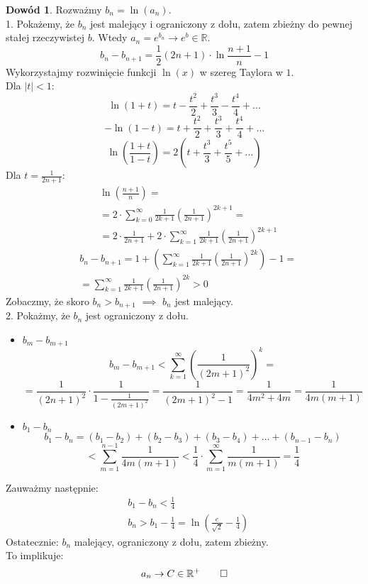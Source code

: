 \documentclass{article}
\theoremstyle{definition}
\theoremstyle{definition}
\newtheorem{dd}{Dowód}[subsection]
\theoremstyle{definition}
\theoremstyle{definition}
\theoremstyle{definition}
\theoremstyle{definition}
\begin{document}
\begin{dd}
    Rozważmy $b_n = \ln(a_n)$.\\
    1. Pokażemy, że $b_n$ jest malejący i ograniczony z dołu, zatem zbieżny do pewnej stałej rzeczywistej $b$. 
    Wtedy $a_n=e^{b_n} \rightarrow e^{b} \in \mathbb{R}$.
    \[b_n - b_{n+1} = \frac{1}{2}(2n+1) \cdot \ln {\frac{n+1}{n}} - 1\]
    Wykorzystajmy rozwinięcie funkcji $\ln(x)$ w szereg Taylora w $1$.\\
    Dla $|t| < 1$:
    \[\ln(1+t) = t - \frac{t^2}{2} + \frac{t^3}{3} - \frac{t^4}{4} + \dots\]
    \[-\ln(1-t) = t + \frac{t^2}{2} + \frac{t^3}{3} + \frac{t^4}{4} + \dots\]
    \[\ln\left(\frac{1+t}{1-t}\right) = 2 \left(t + \frac{t^3}{3} + \frac{t^5}{5} + \dots \right)\]
    Dla $t=\frac{1}{2n+1}$:
    \begin{align}
        &\ln\left(\frac{n+1}{n}\right)=\\
        &= 2\cdot \sum_{k=0}^{\infty} \frac{1}{2k+1} \left(\frac{1}{2n+1}\right)^{2k+1}=\\
        &= 2\cdot \frac{1}{2n+1} + 2\cdot \sum_{k=1}^{\infty} \frac{1}{2k+1} \left(\frac{1}{2n+1}\right)^{2k+1}
    \end{align}
    \begin{align}
        &b_n - b_{n+1} = 1 + \left(\sum_{k=1}^{\infty} \frac{1}{2k+1} \left(\frac{1}{2n+1}\right)^{2k}\right) - 1=\\
        &=\sum_{k=1}^{\infty} \frac{1}{2k+1} \left(\frac{1}{2n+1}\right)^{2k} > 0
    \end{align}
    Zobaczmy, że skoro $b_n > b_{n+1}$ $\implies$ $b_n$ jest malejący.\\
    2. Pokażmy, że $b_n$ jest ograniczony z dołu.
    \begin{itemize}
        \item $b_m-b_{m+1}$
        \[b_m - b_{m+1} < \sum_{k=1}^{\infty} \left(\frac{1}{(2m+1)^2}\right)^{k} =\]
        \[=\frac{1}{(2n+1)^2} \cdot \frac{1}{1-\frac{1}{(2m+1)^2}} = \frac{1}{(2m+1)^2-1} = \frac{1}{4m^2+4m}=\frac{1}{4m(m+1)}\]
        \item $b_1-b_n$
        \[b_1-b_n = (b_1 - b_2) + (b_2 - b_3) + (b_3 - b_4) + \dots + (b_{n-1} - b_n)\]
        \[< \sum_{m=1}^{n-1} \frac{1}{4m(m+1)} < \frac{1}{4} \cdot \sum_{m=1}^{\infty} \frac{1}{m(m+1)} = \frac{1}{4}\]
    \end{itemize}
    Zauważmy następnie:
    \begin{align}
        &b_1-b_n < \frac{1}{4}\\
        &b_n > b_1 - \frac{1}{4} = \ln\left(\frac{e}{\sqrt{2}} - \frac{1}{4}\right)
    \end{align}
    Ostatecznie: $b_n$ malejący, ograniczony z dołu, zatem zbieżny.\\
    To implikuje:
    \[a_n \rightarrow C \in \mathbb{R}^{+} \qed\]
\end{dd}
\end{document}
